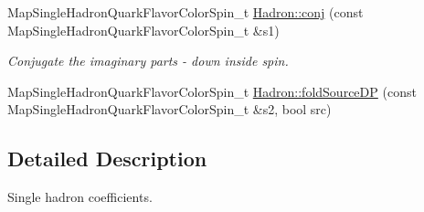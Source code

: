 \begin{DoxyCompactItemize}
Map\+Single\+Hadron\+Quark\+Flavor\+Color\+Spin\+\_\+t \mbox{\hyperlink{namespaceHadron_a225bbef2231c488eb28201396913bae0}{Hadron\+::conj}} (const Map\+Single\+Hadron\+Quark\+Flavor\+Color\+Spin\+\_\+t \&s1)
\begin{DoxyCompactList}\small\item\em Conjugate the imaginary parts -\/ down inside spin. \end{DoxyCompactList}\item 
Map\+Single\+Hadron\+Quark\+Flavor\+Color\+Spin\+\_\+t \mbox{\hyperlink{namespaceHadron_a273b8ceda53ab61615d67cead7c42d94}{Hadron\+::fold\+Source\+DP}} (const Map\+Single\+Hadron\+Quark\+Flavor\+Color\+Spin\+\_\+t \&s2, bool src)
\end{DoxyCompactItemize}


\subsection{Detailed Description}
Single hadron coefficients. 

